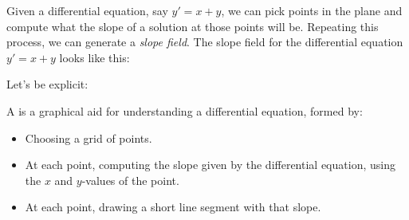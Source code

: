 \documentclass{ximera}
\begin{document}
 
 
  
Given a differential equation, say $y'=x+y$, we can pick points in the
plane and compute what the slope of a solution at those points will
be. Repeating this process, we can generate a \textit{slope field}.
The slope field for the differential equation $y' = x+y$ looks like
this:

\begin{center}
\end{center}
  
Let's be explicit:
\begin{definition}\label{def:directionField}
  A 
  is a graphical aid for understanding a differential equation, formed by:
  \begin{itemize}
    \item Choosing a grid of points.
    \item At each point, computing the slope given by the
          differential equation, using the $x$ and $y$-values of the
          point.
    \item At each point, drawing a short line segment with that
          slope.
\end{itemize}
\end{definition}
\end{document}

